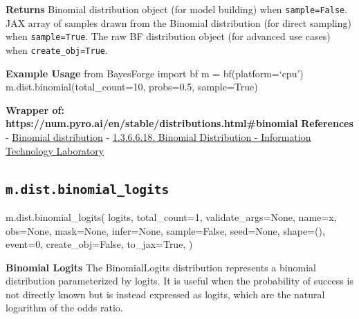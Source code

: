 \documentclass[
  letterpaper,
  DIV=11,
  numbers=noendperiod]{scrartcl}
\newenvironment{Shaded}{\begin{snugshade}}{\end{snugshade}}
\newcommand{\DecValTok}[1]{\textcolor[rgb]{0.68,0.00,0.00}{#1}}
\newcommand{\NormalTok}[1]{\textcolor[rgb]{0.00,0.23,0.31}{#1}}
\newcommand{\OperatorTok}[1]{\textcolor[rgb]{0.37,0.37,0.37}{#1}}
\newcommand{\StringTok}[1]{\textcolor[rgb]{0.13,0.47,0.30}{#1}}
\newcommand{\VariableTok}[1]{\textcolor[rgb]{0.07,0.07,0.07}{#1}}
\begin{document}
\textbf{Returns} Binomial distribution object (for model building) when
\texttt{sample=False}. JAX array of samples drawn from the Binomial
distribution (for direct sampling) when \texttt{sample=True}. The raw BF
distribution object (for advanced use cases) when
\texttt{create\_obj=True}.

\textbf{Example Usage} from BayesForge import bf m = bf(platform=`cpu')
m.dist.binomial(total\_count=10, probs=0.5, sample=True)

\textbf{Wrapper of:
https://num.pyro.ai/en/stable/distributions.html\#binomial}
\textbf{References} -
\href{https://en.wikipedia.org/wiki/Binomial_distribution}{Binomial
distribution} -
\href{https://www.itl.nist.gov/div898/handbook/eda/section3/eda366i.htm}{1.3.6.6.18.
Binomial Distribution - Information Technology Laboratory}

\subsection{\texorpdfstring{\texttt{m.dist.binomial\_logits}}{m.dist.binomial\_logits}}\label{binomial_logits}

\begin{Shaded}
\begin{Highlighting}[]
\NormalTok{m.dist.binomial\_logits(}
\NormalTok{    logits,}
\NormalTok{    total\_count}\OperatorTok{=}\DecValTok{1}\NormalTok{,}
\NormalTok{    validate\_args}\OperatorTok{=}\VariableTok{None}\NormalTok{,}
\NormalTok{    name}\OperatorTok{=}\StringTok{\textquotesingle{}x\textquotesingle{}}\NormalTok{,}
\NormalTok{    obs}\OperatorTok{=}\VariableTok{None}\NormalTok{,}
\NormalTok{    mask}\OperatorTok{=}\VariableTok{None}\NormalTok{,}
\NormalTok{    infer}\OperatorTok{=}\VariableTok{None}\NormalTok{,}
\NormalTok{    sample}\OperatorTok{=}\VariableTok{False}\NormalTok{,}
\NormalTok{    seed}\OperatorTok{=}\VariableTok{None}\NormalTok{,}
\NormalTok{    shape}\OperatorTok{=}\NormalTok{(),}
\NormalTok{    event}\OperatorTok{=}\DecValTok{0}\NormalTok{,}
\NormalTok{    create\_obj}\OperatorTok{=}\VariableTok{False}\NormalTok{,}
\NormalTok{    to\_jax}\OperatorTok{=}\VariableTok{True}\NormalTok{,}
\NormalTok{)}
\end{Highlighting}
\end{Shaded}

\textbf{Binomial Logits} The BinomialLogits distribution represents a
binomial distribution parameterized by logits. It is useful when the
probability of success is not directly known but is instead expressed as
logits, which are the natural logarithm of the odds ratio.
\end{document}
